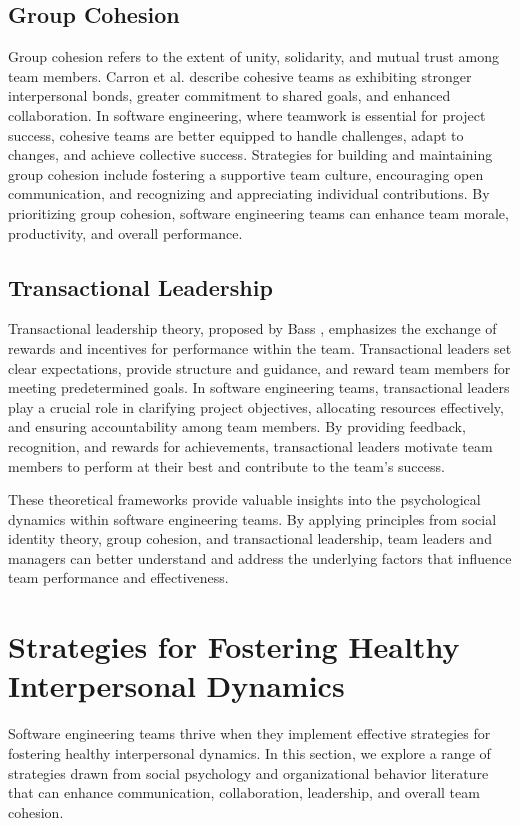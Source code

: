 \documentclass{article}
\begin{document}
\subsection{Group Cohesion}
Group cohesion refers to the extent of unity, solidarity, and mutual trust among team members. Carron et al. \cite{CarronEtAl1998} describe cohesive teams as exhibiting stronger interpersonal bonds, greater commitment to shared goals, and enhanced collaboration. In software engineering, where teamwork is essential for project success, cohesive teams are better equipped to handle challenges, adapt to changes, and achieve collective success. Strategies for building and maintaining group cohesion include fostering a supportive team culture, encouraging open communication, and recognizing and appreciating individual contributions. By prioritizing group cohesion, software engineering teams can enhance team morale, productivity, and overall performance.

\subsection{Transactional Leadership}
Transactional leadership theory, proposed by Bass \cite{Bass1985}, emphasizes the exchange of rewards and incentives for performance within the team. Transactional leaders set clear expectations, provide structure and guidance, and reward team members for meeting predetermined goals. In software engineering teams, transactional leaders play a crucial role in clarifying project objectives, allocating resources effectively, and ensuring accountability among team members. By providing feedback, recognition, and rewards for achievements, transactional leaders motivate team members to perform at their best and contribute to the team's success.

These theoretical frameworks provide valuable insights into the psychological dynamics within software engineering teams. By applying principles from social identity theory, group cohesion, and transactional leadership, team leaders and managers can better understand and address the underlying factors that influence team performance and effectiveness.

\section{Strategies for Fostering Healthy Interpersonal Dynamics}
Software engineering teams thrive when they implement effective strategies for fostering healthy interpersonal dynamics. In this section, we explore a range of strategies drawn from social psychology and organizational behavior literature that can enhance communication, collaboration, leadership, and overall team cohesion.
\end{document}
